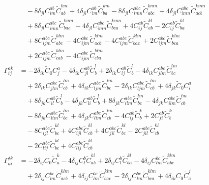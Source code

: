 \begin{align}
&\quad -8 \delta_{jl} C^{ab}_{im} \widetilde{C}^{km}_{ab} + 4 \delta_{jl} C^{ab}_{im} \widetilde{C}^{km}_{ba} - 8 \delta_{jl} C^{abc}_{imn} \widetilde{C}^{kmn}_{abc} + 4 \delta_{jl} C^{abc}_{imn} \widetilde{C}^{kmn}_{acb} \\
&\quad {}+ 8 \delta_{jl} C^{abc}_{imn} \widetilde{C}^{kmn}_{bac} - 4 \delta_{jl} C^{abc}_{imn} \widetilde{C}^{kmn}_{bca} + 4 C^{ab}_{ij} \widetilde{C}^{kl}_{ab} - 2 C^{ab}_{ij} \widetilde{C}^{kl}_{ba} \\
&\quad {}+ 8 C^{abc}_{ijm} \widetilde{C}^{klm}_{abc} - 4 C^{abc}_{ijm} \widetilde{C}^{klm}_{acb} - 4 C^{abc}_{ijm} \widetilde{C}^{klm}_{bac} + 2 C^{abc}_{ijm} \widetilde{C}^{klm}_{bca} \\
&\quad {}+ 2 C^{abc}_{ijm} \widetilde{C}^{klm}_{cab} - 4 C^{abc}_{ijm} \widetilde{C}^{klm}_{cba} \\
\Gamma^{ak}_{ij} &= -2 \delta_{ik} \widetilde{C}_{0} C^{a}_{j} - 4 \delta_{ik} C^{ab}_{jl} \widetilde{C}^{l}_{b} + 2 \delta_{ik} C^{ab}_{lj} \widetilde{C}^{l}_{b} - 4 \delta_{ik} C^{abc}_{jlm} \widetilde{C}^{lm}_{bc} \\
&\quad {}+ 2 \delta_{ik} C^{abc}_{jlm} \widetilde{C}^{lm}_{cb} + 4 \delta_{ik} C^{abc}_{ljm} \widetilde{C}^{lm}_{bc} - 2 \delta_{ik} C^{abc}_{ljm} \widetilde{C}^{lm}_{cb} + 4 \delta_{jk} \widetilde{C}_{0} C^{a}_{i} \\
&\quad {}+ 8 \delta_{jk} C^{ab}_{il} \widetilde{C}^{l}_{b} - 4 \delta_{jk} C^{ab}_{li} \widetilde{C}^{l}_{b} + 8 \delta_{jk} C^{abc}_{ilm} \widetilde{C}^{lm}_{bc} - 4 \delta_{jk} C^{abc}_{ilm} \widetilde{C}^{lm}_{cb} \\
&\quad -8 \delta_{jk} C^{abc}_{lim} \widetilde{C}^{lm}_{bc} + 4 \delta_{jk} C^{abc}_{lim} \widetilde{C}^{lm}_{cb} - 4 C^{ab}_{ij} \widetilde{C}^{k}_{b} + 2 C^{ab}_{ji} \widetilde{C}^{k}_{b} \\
&\quad -8 C^{abc}_{ijl} \widetilde{C}^{kl}_{bc} + 4 C^{abc}_{ijl} \widetilde{C}^{kl}_{cb} + 4 C^{abc}_{jil} \widetilde{C}^{kl}_{bc} - 2 C^{abc}_{jil} \widetilde{C}^{kl}_{cb} \\
&\quad -2 C^{abc}_{lij} \widetilde{C}^{kl}_{bc} + 4 C^{abc}_{lij} \widetilde{C}^{kl}_{cb} \\
\Gamma^{jk}_{ai} &= -2 \delta_{ij} C_{0} \widetilde{C}^{k}_{a} - 4 \delta_{ij} C^{b}_{l} \widetilde{C}^{kl}_{ab} + 2 \delta_{ij} C^{b}_{l} \widetilde{C}^{kl}_{ba} - 4 \delta_{ij} C^{bc}_{lm} \widetilde{C}^{klm}_{abc} \\
&\quad {}+ 2 \delta_{ij} C^{bc}_{lm} \widetilde{C}^{klm}_{acb} + 4 \delta_{ij} C^{bc}_{lm} \widetilde{C}^{klm}_{bac} - 2 \delta_{ij} C^{bc}_{lm} \widetilde{C}^{klm}_{bca} + 4 \delta_{ik} C_{0} \widetilde{C}^{j}_{a} \\

\end{align}
